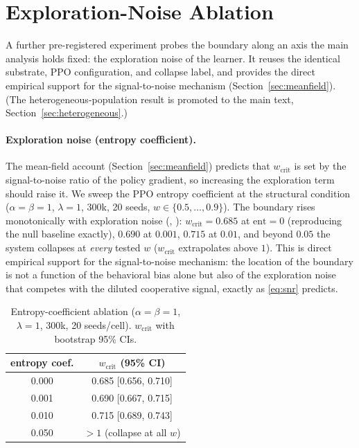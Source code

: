\documentclass[letterpaper]{article}
\theoremstyle{plain}
\newcommand{\wcrit}{w_{\mathrm{crit}}}
\begin{document}
\section{Exploration-Noise Ablation}
\label{sec:appendix_robustness2}

A further pre-registered experiment probes the boundary along an axis the main
analysis holds fixed: the exploration noise of the learner. It reuses the
identical substrate, PPO configuration, and collapse label, and provides the
direct empirical support for the signal-to-noise mechanism
(Section~\ref{sec:meanfield}). (The heterogeneous-population result is promoted
to the main text, Section~\ref{sec:heterogeneous}.)

\paragraph{Exploration noise (entropy coefficient).}
The mean-field account (Section~\ref{sec:meanfield}) predicts that $\wcrit$ is set by
the signal-to-noise ratio of the policy gradient, so increasing the exploration
term should raise it. We sweep the PPO entropy coefficient at the structural
condition ($\alpha{=}\beta{=}1$, $\lambda{=}1$, 300k, 20 seeds, $w\in\{0.5,
\ldots,0.9\}$). The boundary rises monotonically with exploration noise
(, ): $\wcrit = 0.685$ at $\text{ent}{=}0$
(reproducing the null baseline exactly), $0.690$ at $0.001$, $0.715$ at $0.01$,
and beyond $0.05$ the system collapses at \emph{every} tested $w$
($\wcrit$ extrapolates above $1$). This is direct empirical support for the
signal-to-noise mechanism: the location of the boundary is not a function of the
behavioral bias alone but also of the exploration noise that competes with the
diluted cooperative signal, exactly as \eqref{eq:snr} predicts.

\begin{table}[h]
\centering
\caption{Entropy-coefficient ablation ($\alpha{=}\beta{=}1$, $\lambda{=}1$,
300k, 20 seeds/cell). $\wcrit$ with bootstrap 95\% CIs.}
\label{tab:entropy}
\small
\begin{tabular}{cc}
\toprule
entropy coef. & $\wcrit$ (95\% CI) \\
\midrule
0.000 & 0.685 [0.656, 0.710] \\
0.001 & 0.690 [0.667, 0.715] \\
0.010 & 0.715 [0.689, 0.743] \\
0.050 & $>1$ (collapse at all $w$) \\
\bottomrule
\end{tabular}
\end{table}
\end{document}
